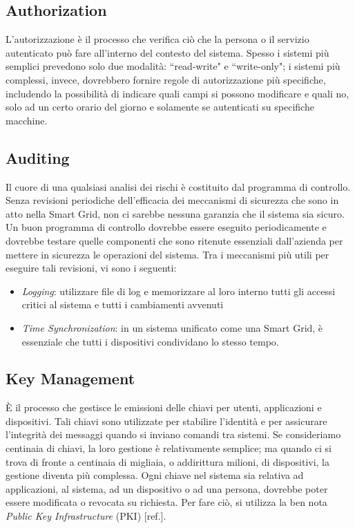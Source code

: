\subsection{Authorization}
L'autorizzazione è il processo che verifica ciò che la persona o il servizio autenticato può fare all'interno del contesto del sistema. \newline 
Spesso i sistemi più semplici prevedono solo due modalità: ``read-write" e ``write-only"; i sistemi più complessi, invece, dovrebbero fornire regole di autorizzazione più specifiche, includendo la possibilità di indicare quali campi si possono modificare e quali no, solo ad un certo orario del giorno e solamente se autenticati su specifiche macchine.

\subsection{Auditing}
Il cuore di una qualsiasi analisi dei rischi è costituito dal programma di controllo. Senza revisioni periodiche dell'efficacia dei meccanismi di sicurezza che sono in atto nella Smart Grid, non ci sarebbe nessuna garanzia che il sistema sia sicuro. \newline
Un buon programma di controllo dovrebbe essere eseguito periodicamente e dovrebbe testare quelle componenti che sono ritenute essenziali dall'azienda per mettere in sicurezza le operazioni del sistema. Tra i meccanismi più utili per eseguire tali revisioni, vi sono i seguenti:
\begin{itemize}
\item \textit{Logging}: utilizzare file di log e memorizzare al loro interno tutti gli accessi critici al sistema e tutti i cambiamenti avvenuti
\item \textit{Time Synchronization}: in un sistema unificato come una Smart Grid, è essenziale che tutti i dispositivi condividano lo stesso tempo.
\end{itemize}

\subsection{Key Management}
È il processo che gestisce le emissioni delle chiavi per utenti, applicazioni e dispositivi. Tali chiavi sono utilizzate per stabilire l'identità e per assicurare l'integrità dei messaggi quando si inviano comandi tra sistemi. \newline 
Se consideriamo centinaia di chiavi, la loro gestione è relativamente semplice; ma quando ci si trova di fronte a centinaia di migliaia, o addirittura milioni, di dispositivi, la gestione diventa più complessa. Ogni chiave nel sistema sia relativa ad applicazioni, al sistema, ad un dispositivo o ad una persona, dovrebbe poter essere modificata o revocata su richiesta. 
\newline Per fare ciò, si utilizza la ben nota \textit{Public Key Infrastructure} (PKI) [ref.].

